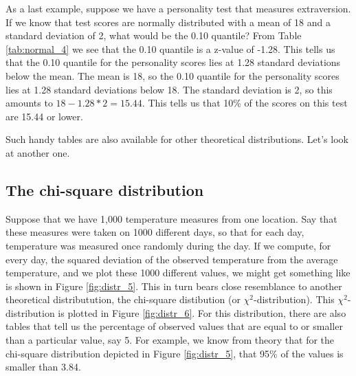 \documentclass[]{report}\usepackage[]{graphicx}\usepackage[]{color}
\begin{document}
As a last example, suppose we have a personality test that measures extraversion. If we know that test scores are normally distributed with a mean of 18 and a standard deviation of 2, what would be the 0.10 quantile? From Table \ref{tab:normal_4} we see that the 0.10 quantile is a z-value of -1.28. This tells us that the 0.10 quantile for the personality scores lies at 1.28 standard deviations below the mean. The mean is 18, so the 0.10 quantile for the personality scores lies at 1.28 standard deviations below 18. The standard deviation is 2, so this amounts to $18-1.28*2=15.44$. This tells us that 10\% of the scores on this test are 15.44 or lower. 

Such handy tables are also available for other theoretical distributions. Let's look at another one.  

\subsection{The chi-square distribution}
Suppose that we have 1,000 temperature measures from one location. Say that these measures were taken on 1000 different days, so that for each day, temperature was measured once randomly during the day. If we compute, for every day, the squared deviation of the observed temperature from the average temperature, and we plot these 1000 different values, we might get something like is shown in Figure \ref{fig:distr_5}. This in turn bears close resemblance to another theoretical distributution, the chi-square distibution (or $\chi^2$-distribution). This $\chi^2$-distribution is plotted in Figure \ref{fig:distr_6}. For this distribution, there are also tables that tell us the percentage of observed values that are equal to or smaller than a particular value, say 5. For example, we know from theory that for the chi-square distribution depicted in Figure \ref{fig:distr_5}, that 95\% of the values is smaller than 3.84.
\end{document}
